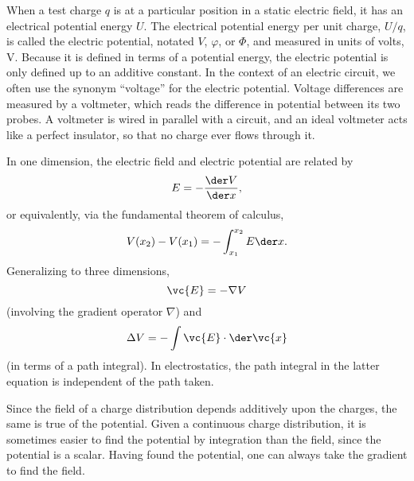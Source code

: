 When a test charge $q$ is at a particular position in a static electric field, it has an electrical
potential energy $U$. The electrical potential energy per unit charge, $U/q$, is
called the electric potential, notated $V$, $\varphi$, or $\Phi$, and measured
in units of volts, V. Because it is defined in terms of a potential energy, the
electric potential is only defined up to an additive constant. In the context of
an electric circuit, we often use the synonym ``voltage'' for the electric potential.
Voltage differences are measured by a voltmeter, which reads the difference in
potential between its two probes. A voltmeter is wired in parallel with a circuit,
and an ideal voltmeter acts like a perfect insulator, so that no charge ever flows through it.

In one dimension, the electric field and electric potential are related by
\begin{equation*}
  E = -\frac{\der V}{\der x},
\end{equation*}
or equivalently, via the fundamental theorem of calculus,
\begin{equation*}
  V(x_2)-V(x_1) = -\int_{x_1}^{x_2} E \der x.
\end{equation*}
Generalizing to three dimensions,
\begin{equation*}
  \vc{E} = -\nabla V
\end{equation*}
(involving the gradient operator $\nabla$) and
\begin{equation*}
  \Delta V = -\int \vc{E}\cdot\der\vc{x}
\end{equation*}
(in terms of a path integral).
In electrostatics, the path integral in the latter equation is independent
of the path taken.

Since the field of a charge distribution depends additively upon the
charges, the same is true of the potential. Given a continuous charge distribution,
it is sometimes easier to find the potential by integration than the field, since
the potential is a scalar. Having found the potential, one can always take the
gradient to find the field.

